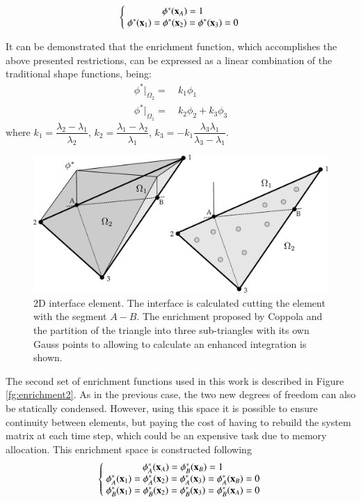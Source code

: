 \begin{equation}
   \left\{\;
   \begin{matrix}
      \phi^*(\mathbf{x}_A)= 1 \\
      \phi^*(\mathbf{x}_1)= \phi^*(\mathbf{x}_2)=\phi^*(\mathbf{x}_3)= 0
   \end{matrix}\;
   \right.
   \label{eq:enrich-1a}
\end{equation}

It can be demonstrated\cite{Coppola05} that the enrichment function, which accomplishes the above presented restrictions, can be expressed as a linear combination of the traditional shape functions, being:
 \begin{align}
    \phi^*|_{\Omega_2} = & \ k_1 \phi_1 \label{phi_enrichment-2}\\
    \phi^*|_{\Omega_1} = & \ k_2 \phi_2 + k_3 \phi_3 \label{phi_enrichment-1}
  \end{align}
where $k_1 = \dfrac{\lambda_2-\lambda_1}{\lambda_2}$, $k_2 = \dfrac{\lambda_1-\lambda_2}{\lambda_1}$, $k_3 = -k_1\dfrac{\lambda_3\lambda_1}{\lambda_3-\lambda_1}$.

\begin{figure}[H]
  \centering
  \includegraphics[width=.9\columnwidth]{images/enrichment1.pdf}
   \caption{2D interface element. The interface is calculated cutting the element with the segment $A-B$. The enrichment proposed by Coppola and the partition of the triangle into three sub-triangles with its own Gauss points to allowing to calculate an enhanced integration is shown.}
   \label{fg:enrichment1}                %
\end{figure}

The second set of enrichment functions used in this work is described in Figure \ref{fg:enrichment2}. As in the previous case, the two new degrees of freedom can also be statically condensed. However, using this space it is possible to ensure continuity between elements, but paying the cost of having to rebuild the system matrix at each time step, which could be an expensive task due to memory allocation.
This enrichment space is constructed following
\begin{equation}
   \left\{\;
   \begin{matrix}
     \phi_A^*(\mathbf{x}_A)=\phi_B^*(\mathbf{x}_B)=1 \\
     \phi_A^*(\mathbf{x}_1)=\phi_A^*(\mathbf{x}_2)=\phi_A^*(\mathbf{x}_3)=\phi_A^*(\mathbf{x}_B)=0 \\
     \phi_B^*(\mathbf{x}_1)=\phi_B^*(\mathbf{x}_2)=\phi_B^*(\mathbf{x}_3)=\phi_B^*(\mathbf{x}_A)=0
   \end{matrix}\;
   \right.
   \label{eq:enrich-2a}
\end{equation}

